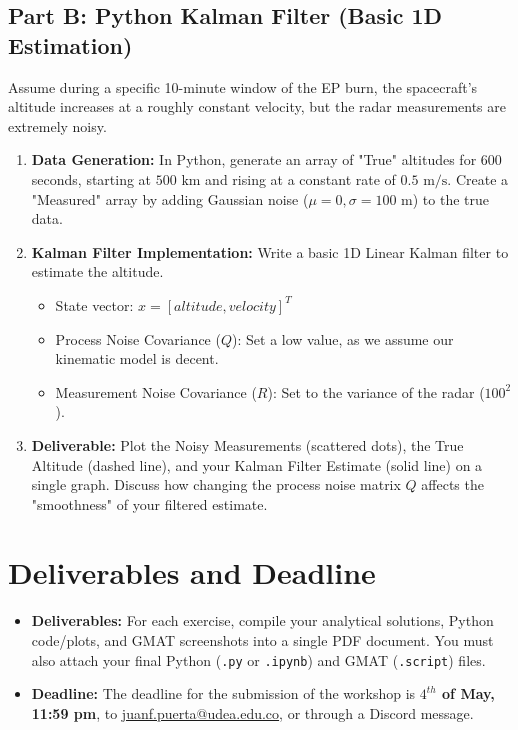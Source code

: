 \documentclass[11pt, letterpaper]{article}
\begin{document}
\subsection*{Part B: Python Kalman Filter (Basic 1D Estimation)}
Assume during a specific 10-minute window of the EP burn, the spacecraft's altitude increases at a roughly constant velocity, but the radar measurements are extremely noisy. 
\begin{enumerate}
    \item \textbf{Data Generation:} In Python, generate an array of "True" altitudes for 600 seconds, starting at $500 \text{ km}$ and rising at a constant rate of $0.5 \text{ m/s}$. Create a "Measured" array by adding Gaussian noise ($\mu=0, \sigma=100 \text{ m}$) to the true data.
    \item \textbf{Kalman Filter Implementation:} Write a basic 1D Linear Kalman filter to estimate the altitude. 
        \begin{itemize}
            \item State vector: $x = [altitude, velocity]^T$
            \item Process Noise Covariance ($Q$): Set a low value, as we assume our kinematic model is decent.
            \item Measurement Noise Covariance ($R$): Set to the variance of the radar ($100^2$).
        \end{itemize}
    \item \textbf{Deliverable:} Plot the Noisy Measurements (scattered dots), the True Altitude (dashed line), and your Kalman Filter Estimate (solid line) on a single graph. Discuss how changing the process noise matrix $Q$ affects the "smoothness" of your filtered estimate.
\end{enumerate}

\section*{Deliverables and Deadline}
\begin{itemize}
    \item \textbf{Deliverables:} For each exercise, compile your analytical solutions, Python code/plots, and GMAT screenshots into a single PDF document. You must also attach your final Python (\texttt{.py} or \texttt{.ipynb}) and GMAT (\texttt{.script}) files.
    \item \textbf{Deadline:} The deadline for the submission of the workshop is \textbf{$4^{th}$ of May, 11:59 pm}, to \href{mailto:juanf.puerta@udea.edu.co}{juanf.puerta@udea.edu.co}, or through a Discord message.
\end{itemize}
\end{document}
